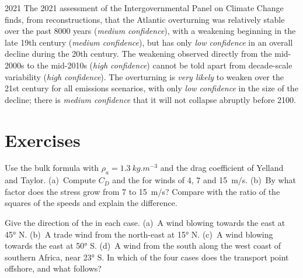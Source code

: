 \begin{dated}{2021}
The 2021 assessment of the Intergovernmental Panel on Climate Change finds, from
reconstructions, that the Atlantic overturning was relatively stable over the past
\num{8000} years (\emph{medium confidence}), with a weakening beginning in the late
19th century (\emph{medium confidence}), but has only \emph{low confidence} in an
overall decline during the 20th century. The weakening observed directly from the
mid-2000s to the mid-2010s (\emph{high confidence}) cannot be told apart from
decade-scale variability (\emph{high confidence}). The overturning is \emph{very
likely} to weaken over the 21st century for all emissions scenarios, with only
\emph{low confidence} in the size of the decline; there is \emph{medium confidence}
that it will not collapse abruptly before 2100.
\end{dated}

\section{Exercises}

\begin{exercise}[$\star$]\label{exo:b1:ocean-circulation:1}
Use the bulk formula with $\rho_a = \qty{1.3}{kg.m^{-3}}$ and the drag coefficient
of Yelland and Taylor. (a)~Compute $C_D$ and the  for winds of 4, 7 and
\qty{15}{m/s}. (b)~By what factor does the stress grow from 7 to \qty{15}{m/s}?
Compare with the ratio of the squares of the speeds and explain the difference.
\end{exercise}

\begin{exercise}[$\star$]\label{exo:b1:ocean-circulation:2}
Give the direction of the  in each case. (a)~A wind blowing towards
the east at \ang{45} N. (b)~A trade wind from the north-east at \ang{15} N.
(c)~A wind blowing towards the east at \ang{50} S. (d)~A wind from the south along
the west coast of southern Africa, near \ang{23} S. In which of the four cases does
the transport point offshore, and what follows?
\end{exercise}

